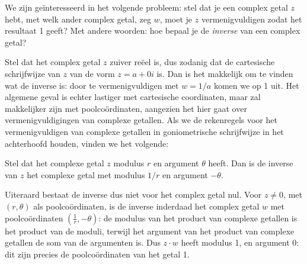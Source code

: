 \documentclass{ximera}
\begin{document}
\begin{xmuitweiding}
We zijn geïnteresseerd in het volgende probleem: stel dat je een complex getal $z$ hebt, met welk ander complex getal, zeg $w$, moet je $z$ vermenigvuldigen zodat het resultaat 1 geeft? Met andere woorden: hoe bepaal je de \textit{inverse} van een complex getal?
 
Stel dat het complex getal $z$ zuiver reëel is, dus zodanig dat de cartesische schrijfwijze van $z$ van de vorm $z = a + 0i$ is. Dan is het makkelijk om te vinden wat de inverse is: door te vermenigvuldigen met $w = 1/a$ komen we op 1 uit. Het algemene geval is echter lastiger met cartesische coordinaten,
maar zal makkelijker zijn met poolcoördinaten, aangezien het hier gaat over vermenigvuldigingen van complexe getallen. Als we de rekenregels voor het vermenigvuldigen van complexe getallen in goniometrische schrijfwijze in het achterhoofd houden, vinden we het volgende:
 
\begin{proposition}
Stel dat het complexe getal $z$ modulus $r$ en argument $\theta$ heeft. Dan is de inverse van $z$ het complexe getal met modulus $1/r$ en argument $-\theta$. 
\end{proposition}
 
Uiteraard bestaat de inverse dus niet voor het complex getal nul. Voor $z\neq 0$, met $(r, \theta)$ als poolcoördinaten, is de inverse inderdaad het complex getal $w$ met poolcoördinaten $\left(\frac{1}{r}, -\theta\right)$: de modulus van het product van complexe getallen is het product van de moduli, terwijl het argument van het product van complexe getallen de som van de argumenten is. Dus $z\cdot w$ heeft modulus 1, en argument 0: dit zijn precies de poolcoördinaten van het getal 1.
\end{xmuitweiding}
 
 
\end{document}
